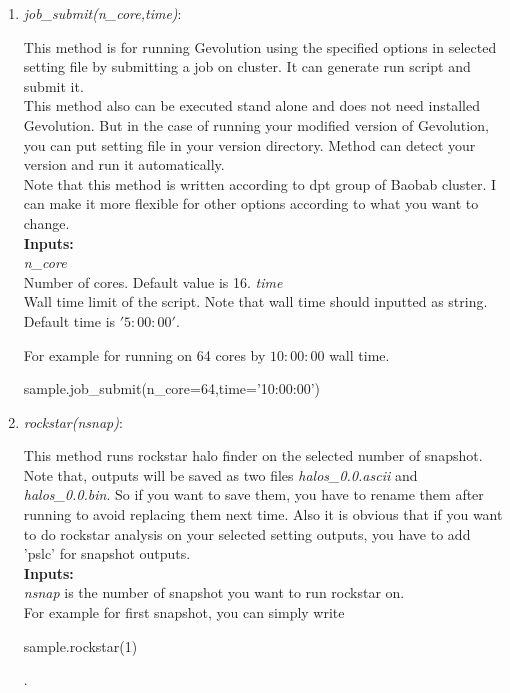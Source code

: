 \documentclass[a4paper, 12 pt]{article}
\begin{document}
\begin{enumerate}
\item \textit{job\_submit(n\_core,time)}:

This method is for running Gevolution using the specified options in selected setting file by submitting a job on cluster. It can generate run script and submit it.\\
This method also can be executed stand alone and does not need installed Gevolution. But in the case of running your modified version of Gevolution, you can put setting file in your version directory. Method can detect your version and run it automatically. \\

Note that this method is written according to dpt group of Baobab cluster. I can make it more flexible for other options according to what you want to change.\\

\textbf{Inputs:}\\
\textit{n\_core}\\ Number of cores. Default value is 16.
\textit{time}\\ Wall time limit of the script. Note that wall time should inputted as string. Default time is $'5:00:00'$.

For example for running on 64 cores by $10:00:00$ wall time.
\begin{python}[language=Python, caption=job submit]
sample.job_submit(n_core=64,time='10:00:00')
\end{python}

\item \textit{rockstar(nsnap)}:

This method runs rockstar halo finder on the selected number of snapshot. Note that, outputs will be saved as two files \textit{halos\_0.0.ascii} and \textit{halos\_0.0.bin}. So if you want to save them, you have to rename them after running to avoid replacing them next time. Also it is obvious that if you want to do rockstar analysis on your selected setting outputs, you have to add 'pslc' for snapshot outputs.\\

\textbf{Inputs:}\\
\textit{nsnap} is the number of snapshot you want to run rockstar on.\\

For example for first snapshot, you can simply write
\begin{python}[language=Python, caption=rockstar]
sample.rockstar(1)
\end{python}.


\end{enumerate}
\end{document}
